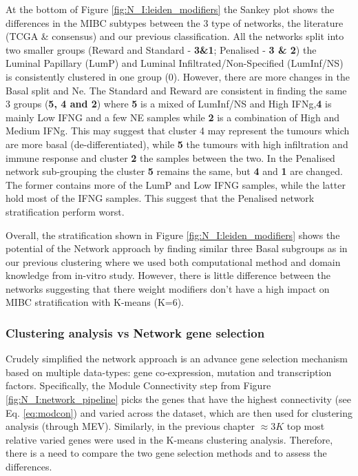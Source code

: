 At the bottom of Figure \ref{fig:N_I:leiden_modifiers} the Sankey plot shows the differences in the MIBC subtypes between the 3 type of networks, the literature (TCGA \& consensus) and our previous classification. All the networks split into two smaller groups (Reward and Standard - \textbf{3\&1}; Penalised - \textbf{3 \& 2}) the Luminal Papillary (LumP) and Luminal Infiltrated/Non-Specified (LumInf/NS) is consistently clustered in one group (0). However, there are more changes in the Basal split and Ne. The Standard and Reward are consistent in finding the same 3 groups (\textbf{5, 4 and 2}) where\textbf{ 5} is a mixed of LumInf/NS and High IFNg,\textbf{4} is mainly Low IFNG and a few NE samples while \textbf{2} is a combination of High and Medium IFNg. This may suggest that cluster 4 may represent the tumours which are more basal (de-differentiated), while \textbf{5} the tumours with high infiltration and immune response and cluster \textbf{2} the samples between the two. In the Penalised network sub-grouping the cluster \textbf{5} remains the same, but \textbf{4} and \textbf{1} are changed. The former contains more of the LumP and Low IFNG samples, while the latter hold most of the IFNG samples. This suggest that the Penalised network stratification perform worst.

Overall, the stratification shown in Figure \ref{fig:N_I:leiden_modifiers} shows the potential of the Network approach by finding similar three Basal subgroups as in our previous clustering where we used both computational method and domain knowledge from in-vitro study\citet{Baker2022-bj}. However, there is little difference between the networks suggesting that there weight modifiers don't have a high impact on MIBC stratification with K-means (K=6).

\subsubsection{Clustering analysis vs Network gene selection} \label{s:N_I:cs_vs_gene_sel}

Crudely simplified the network approach is an advance gene selection mechanism based on multiple data-types: gene co-expression, mutation and transcription factors. Specifically, the Module Connectivity step from Figure \ref{fig:N_I:network_pipeline} picks the genes that have the highest connectivity (see Eq. \ref{eq:modcon}) and varied across the dataset, which are then used for clustering analysis (through MEV). Similarly, in the previous chapter $\approx3K$ top most relative varied genes were used in the K-means clustering analysis. Therefore, there is a need to compare the two gene selection methods and to assess the differences.

